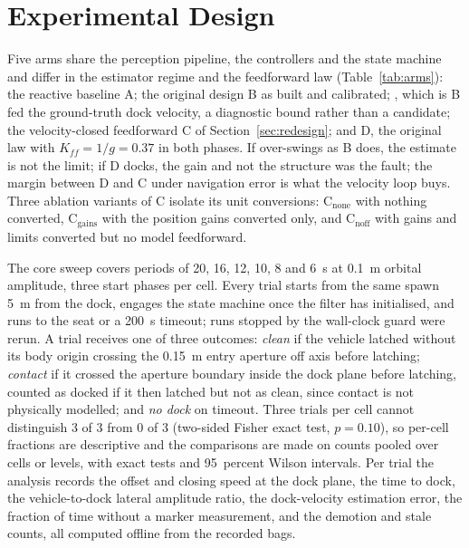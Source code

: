 \section{Experimental Design}
\label{sec:design}

Five arms share the perception pipeline, the controllers and the state machine and differ in the estimator regime and the feedforward law (Table~\ref{tab:arms}): the reactive baseline A; the original design B as built and calibrated; \Bgt, which is B fed the ground-truth dock velocity, a diagnostic bound rather than a candidate; the velocity-closed feedforward C of Section~\ref{sec:redesign}; and D, the original law with $K_{ff} = 1/g = 0.37$ in both phases. If \Bgt{} over-swings as B does, the estimate is not the limit; if D docks, the gain and not the structure was the fault; the margin between D and C under navigation error is what the velocity loop buys. Three ablation variants of C isolate its unit conversions: C$_\mathrm{none}$ with nothing converted, C$_\mathrm{gains}$ with the position gains converted only, and C$_\mathrm{noff}$ with gains and limits converted but no model feedforward.

The core sweep covers periods of 20, 16, 12, 10, 8 and 6~s at 0.1~m orbital amplitude, three start phases per cell. Every trial starts from the same spawn 5~m from the dock, engages the state machine once the filter has initialised, and runs to the seat or a 200~s timeout; runs stopped by the wall-clock guard were rerun. A trial receives one of three outcomes: \emph{clean} if the vehicle latched without its body origin crossing the 0.15~m entry aperture off axis before latching; \emph{contact} if it crossed the aperture boundary inside the dock plane before latching, counted as docked if it then latched but not as clean, since contact is not physically modelled; and \emph{no dock} on timeout. Three trials per cell cannot distinguish 3 of 3 from 0 of 3 (two-sided Fisher exact test, $p = 0.10$), so per-cell fractions are descriptive and the comparisons are made on counts pooled over cells or levels, with exact tests and 95~percent Wilson intervals. Per trial the analysis records the offset and closing speed at the dock plane, the time to dock, the vehicle-to-dock lateral amplitude ratio, the dock-velocity estimation error, the fraction of time without a marker measurement, and the demotion and stale counts, all computed offline from the recorded bags.

